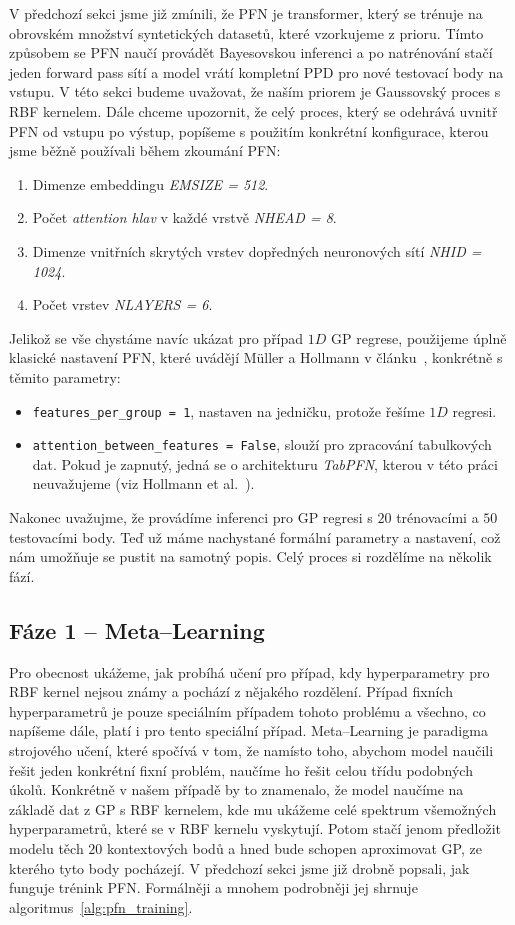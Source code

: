 V předchozí sekci jsme již zmínili, že PFN je transformer, který se trénuje na obrovském množství syntetických datasetů, které vzorkujeme z prioru.
Tímto způsobem se PFN naučí provádět Bayesovskou inferenci a po natrénování stačí jeden forward pass sítí a model vrátí kompletní PPD pro nové testovací body na vstupu. 
V této sekci budeme uvažovat, že naším priorem je Gaussovský proces s RBF kernelem.
Dále chceme upozornit, že celý proces, který se odehrává uvnitř PFN od vstupu po výstup, popíšeme s použitím konkrétní konfigurace, kterou jsme běžně používali během zkoumání PFN:
\begin{enumerate}
    \item Dimenze embeddingu \textit{EMSIZE = 512}.
    \item Počet \emph{attention hlav} v každé vrstvě \textit{NHEAD = 8}. 
    \item Dimenze vnitřních skrytých vrstev dopředných neuronových sítí \textit{NHID = 1024}.
    \item Počet vrstev \textit{NLAYERS = 6}.
\end{enumerate}
Jelikož se vše chystáme navíc ukázat pro případ $1D$ GP regrese, použijeme úplně klasické nastavení PFN, které uvádějí Müller a Hollmann v článku~\cite{muller2022}, konkrétně s těmito parametry:
\begin{itemize}
    \item \lstinline|features_per_group = 1|, nastaven na jedničku, protože řešíme $1D$ regresi.
    \item \lstinline|attention_between_features = False|, slouží pro zpracování tabulkových dat. Pokud je zapnutý, jedná se o architekturu \textit{TabPFN}, kterou v této práci neuvažujeme (viz Hollmann et al.~\cite{hollmann2023}).
\end{itemize}
Nakonec uvažujme, že provádíme inferenci pro GP regresi s $20$ trénovacími a $50$ testovacími body. 
Teď už máme nachystané formální parametry a nastavení, což nám umožňuje se pustit na samotný popis.
Celý proces si rozdělíme na několik fází.

\subsection{Fáze 1 – Meta–Learning}
\label{subsec:faze1-metalearning}
Pro obecnost ukážeme, jak probíhá učení pro případ, kdy hyperparametry pro RBF kernel nejsou známy a pochází z nějakého rozdělení. 
Případ fixních hyperparametrů je pouze speciálním případem tohoto problému a všechno, co napíšeme dále, platí i pro tento speciální případ. 
Meta–Learning je paradigma strojového učení, které spočívá v tom, že namísto toho, abychom model naučili řešit jeden konkrétní fixní problém, naučíme ho řešit celou třídu podobných úkolů.
Konkrétně v našem případě by to znamenalo, že model naučíme na základě dat z GP s RBF kernelem, kde mu ukážeme celé spektrum všemožných hyperparametrů, které se v RBF kernelu vyskytují. 
Potom stačí jenom předložit modelu těch $20$ kontextových bodů a hned bude schopen aproximovat GP, ze kterého tyto body pocházejí. 
V předchozí sekci jsme již drobně popsali, jak funguje trénink PFN. Formálněji a mnohem podrobněji jej shrnuje algoritmus~\ref{alg:pfn_training}.

